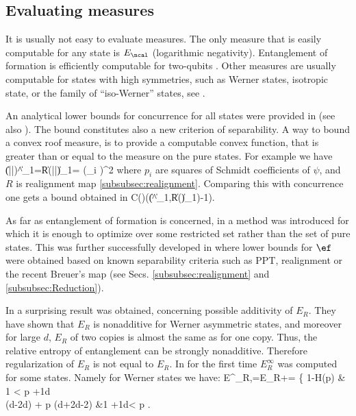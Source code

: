 \documentclass[twocolumn,aps,rmp]{revtex4}
\begin{document}
\subsection{Evaluating measures}
\label{subsec-evaluating}

It is usually not easy to evaluate measures. The only measure that
is easily computable for any state is $E_\ncal$ (logarithmic
negativity). Entanglement of formation is efficiently computable for
two-qubits \cite{Wootters-conc}. Other measures are usually
computable for states with high symmetries, such as Werner states,
isotropic state, or the family of ``iso-Werner'' states, see
\cite{BDSW1996,TerhalV2000-eof-iso,VollbrechtW2000-ent-sym,
Rains1999,Rains-erratum1999}.

An analytical lower bounds for concurrence for all states were provided
in \cite{MintertKB04-conc} (see also \cite{AudenaertVM2000-concurrence}).
The bound constitutes also a new criterion of separability. A way to bound a convex roof measure, is to provide a computable convex function, that is greater than or equal to the measure on the pure states.
For example  we have
\be
\|(|\psi\>\<\psi|)^\Gamma\|_1=\|R(|\psi\>\<\psi|)\|_1=
\left(\sum_i \right)^2
\ee
where $p_i$ are squares of Schmidt coefficients of $\psi$, and $R$
is realignment map \ref{subsubsec:realignment}. Comparing
this with concurrence one gets  a bound obtained in \cite{AlbeverioLowerBoundPRL1}
\be
C(\rho)\geq {}(\max (\|\rho^\Gamma\|_1,\|R(\rho)\|_1)-1).
\ee

As far as entanglement of formation is concerned, in \cite{TerhalV2000-eof-iso} a method was introduced for which
it is enough to optimize over some  restricted set rather than the set of pure
states. This was further successfully developed in
\cite{FeiX2006-R-EF,AlbeverioLowerBoundPRL,DattaFSC2006-maps-EMs}
where lower bounds for $\ef$ were obtained based on known separability criteria such as PPT, realignment or the recent Breuer's map
(see Secs. \ref{subsubsec:realignment} and  \ref{subsubsec:Reduction}).

In \cite{VollbrechtW2000-ent-sym} a surprising result was obtained, concerning possible
additivity of $E_{R}$. They have shown that $E_R$ is nonadditive
for Werner asymmetric states, and moreover for large $d$, $E_R$ of two copies is almost the same as for one copy. Thus, the
relative entropy of entanglement can be strongly nonadditive.
Therefore regularization of $E_R$ is not equal to $E_R$. In \cite{AEJPVM2001}
for the first time $E_R^\infty$ was computed  for some states.
Namely for Werner states we have:
\be
E^\infty_{R,\scal}=E_{R+\ncal}=
\left\{
1-H(p) & {1} < p +{1\over d}\\
\log \left({d-2\over d}\right) + p \log \left({d+2\over d-2}\right) &{1}
+{1\over d}<
p
\eea
\right.
\ee
\end{document}
